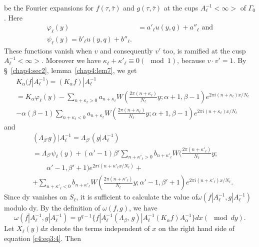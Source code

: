 be the Fourier expansions for $f(\tau,\bar{\tau})$ and
$g(\tau,\bar{\tau})$ at the cups $A^{-1}_{\ell}<\infty>$ of
$\Gamma_0$. Here
\begin{align*}
\varphi_{\ell}(y) & = a'_{\ell} u(y,q) + a''_{\ell} \text{ and}\\
\psi_{\ell}(y) = b'_{\ell} u (y,q) + b''_{\ell}.
\end{align*}
These functions vanish when $v$ and consequently $v'$ too, is ramified
at the cusp $A^{-1}_{\ell}<\infty>$. Moreover we have
$\kappa_{\ell}+\kappa'_{\ell} \equiv 0(\mod 1)$, because $v\cdot
v'=1$. By \S~\ref{chap4:sec2}, lemma~\ref{chap4:lem7}, we get 
\begin{align*}
& K_{\alpha}(f|A^{-1}_{\ell}) = (K_{\alpha}f)|A^{-1}_{\ell}\\
& = K_{\alpha}\varphi_{\ell}(y) - \sum_{n+\kappa_{\ell}>0}
  a_{n+\kappa_{\ell}} W (\frac{2\pi(n+\kappa_{\ell})}{N_{\ell}} y;
  \alpha+1, \beta-1) e^{2\pi i (n+\kappa_{\ell})x/N_{\ell}}\\
& - \alpha(\beta-1) \sum_{n+\kappa_{\ell}<0} a_{n+\kappa_{\ell}}
  W(\frac{2\pi (n+\kappa_{\ell})}{N_{\ell}} y; \alpha+1, \beta-1)
  e^{2\pi i (n+\kappa_{\ell})x/N_{\ell}}
  \end{align*}
and \pageoriginale
\begin{align*}
& (\Lambda_{\beta'} g)|A^{-1}_{\ell}= \Lambda_{\beta'}
  (g|A^{-1}_{\ell})\\
& = \Lambda_{\beta'} \psi_{\ell}(y) + (\alpha'-1) \beta'
  \sum_{n+\kappa'_{\ell}>0} b_{n+\kappa'_{\ell}} W
  (\frac{2\pi(n+\kappa'_{\ell})}{N_{\ell}}y;\\
&\qquad\alpha'-1,
  \beta'+1)e^{2\pi i(n+\kappa'_{\ell}x/N_{\ell})} +\\
& + \sum_{n+\kappa'_{\ell}<0} b_{n+\kappa'_{\ell}}
  W(\frac{2\pi(n+\kappa'_{\ell})}{N_{\ell}}y;\alpha'-1,\beta'+1)
  e^{2\pi i(n+\kappa'_{\ell})x/N_{\ell}}.
\end{align*}
Since dy vanishes on $S_{\ell}$, it is sufficient to calculate the
value of\break $\omega(f|A^{-1}_{\ell}, g|A^{-1}_{\ell})$ modulo dy. By the
definition of $\omega(f,g)$, we have 
\begin{equation*}
\omega(f|A^{-1}_{\ell}, g|A^{-1}_{\ell}) = y^{q-1} \{f|A^{-1}_{\ell}
(\Lambda_{\beta},\,g) |A^{-1}_{\ell}(K_{\alpha}f)A^{-1}_{\alpha} \} dx
(\mod dy). \tag{4}\label{c4:eq3:4}
\end{equation*}
Let $X_{\ell}(y)dx$ denote the terms independent of $x$ on the right
hand side of equation \eqref{c4:eq3:4}. Then 
